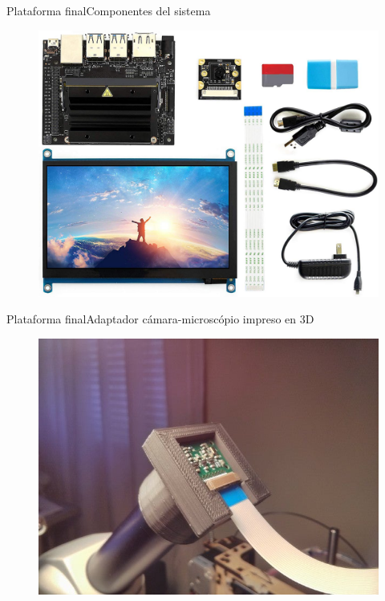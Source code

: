 \documentclass{beamer}
\begin{document}
    \begin{frame}{Plataforma final}{Componentes del sistema}
        \begin{figure}[]
            \centering
            \includegraphics[height=0.95\textheight]{componentes}
        \end{figure}
    \end{frame}

    \begin{frame}{Plataforma final}{Adaptador cámara-microscópio impreso en 3D}
        \begin{figure}[]
            \centering
            \includegraphics[height=0.95\textheight]{adaptador_final}
        \end{figure}
    \end{frame}
\end{document}
